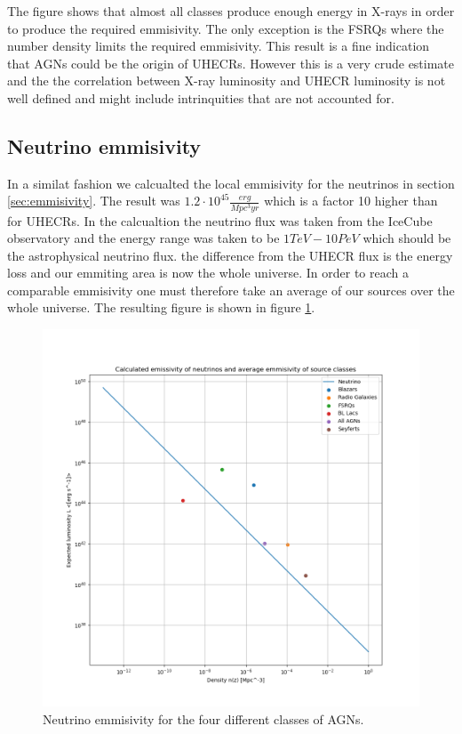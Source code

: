 \documentclass{article}
\begin{document}
The figure shows that almost all classes produce enough energy in X-rays in order to produce the required emmisivity. The only exception is the FSRQs where the number
density limits the required emmisivity. This result is a fine indication that AGNs could be the origin of UHECRs. However this is a very crude estimate and the
the correlation between X-ray luminosity and UHECR luminosity is not well defined and might include intrinquities that are not accounted for.

\subsection{Neutrino emmisivity}
In a similat fashion we calcualted the local emmisivity for the neutrinos in section \ref{sec:emmisivity}. The result was $1.2 \cdot 10^{45}\frac{erg}{Mpc^3yr}$ which is a factor 10 higher than for UHECRs.
In the calcualtion the neutrino flux was taken from the IceCube observatory \cite{Abbasi_2022} and the energy range was taken to be $1TeV - 10PeV$ which should be the astrophysical neutrino flux.
the difference from the UHECR flux is the energy loss and our emmiting area is now the whole universe. In order to reach a comparable emmisivity one must therefore take an average of our sources over the whole universe.
The  resulting figure is shown in figure \ref{fig:neutrino}.

\begin{figure}[H]
    \centering
    \includegraphics[width = \textwidth]{new_plots/L_n_neut_calc.png}
    \caption{Neutrino emmisivity for the four different classes of AGNs.}
    \label{fig:neutrino}
\end{figure}
\end{document}
